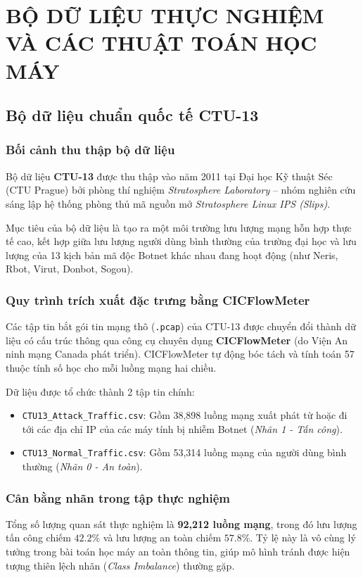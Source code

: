 \documentclass[12pt,a4paper,oneside]{report}
\begin{document}
\chapter{BỘ DỮ LIỆU THỰC NGHIỆM VÀ CÁC THUẬT TOÁN HỌC MÁY}

\section{Bộ dữ liệu chuẩn quốc tế CTU-13}
\subsection{Bối cảnh thu thập bộ dữ liệu}
Bộ dữ liệu \textbf{CTU-13} được thu thập vào năm 2011 tại Đại học Kỹ thuật Séc (CTU Prague) bởi phòng thí nghiệm \textit{Stratosphere Laboratory} – nhóm nghiên cứu sáng lập hệ thống phòng thủ mã nguồn mở \textit{Stratosphere Linux IPS (Slips)}.

Mục tiêu của bộ dữ liệu là tạo ra một môi trường lưu lượng mạng hỗn hợp thực tế cao, kết hợp giữa lưu lượng người dùng bình thường của trường đại học và lưu lượng của 13 kịch bản mã độc Botnet khác nhau đang hoạt động (như Neris, Rbot, Virut, Donbot, Sogou).

\subsection{Quy trình trích xuất đặc trưng bằng CICFlowMeter}
Các tập tin bắt gói tin mạng thô (\texttt{.pcap}) của CTU-13 được chuyển đổi thành dữ liệu có cấu trúc thông qua công cụ chuyên dụng \textbf{CICFlowMeter} (do Viện An ninh mạng Canada phát triển). CICFlowMeter tự động bóc tách và tính toán 57 thuộc tính số học cho mỗi luồng mạng hai chiều.

Dữ liệu được tổ chức thành 2 tập tin chính:
\begin{itemize}
  \item \texttt{CTU13\_Attack\_Traffic.csv}: Gồm 38,898 luồng mạng xuất phát từ hoặc đi tới các địa chỉ IP của các máy tính bị nhiễm Botnet (\textit{Nhãn 1 - Tấn công}).
  \item \texttt{CTU13\_Normal\_Traffic.csv}: Gồm 53,314 luồng mạng của người dùng bình thường (\textit{Nhãn 0 - An toàn}).
\end{itemize}

\subsection{Cân bằng nhãn trong tập thực nghiệm}
Tổng số lượng quan sát thực nghiệm là \textbf{92,212 luồng mạng}, trong đó lưu lượng tấn công chiếm $42.2\%$ và lưu lượng an toàn chiếm $57.8\%$. Tỷ lệ này là vô cùng lý tưởng trong bài toán học máy an toàn thông tin, giúp mô hình tránh được hiện tượng thiên lệch nhãn (\textit{Class Imbalance}) thường gặp.
\end{document}
